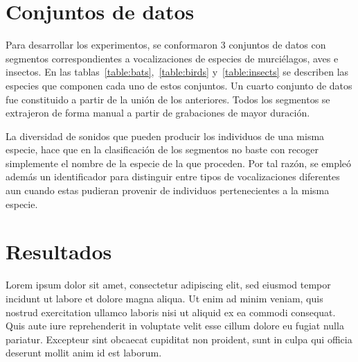 \section{Conjuntos de datos}\label{sec:datasets}

Para desarrollar los experimentos, se conformaron 3 conjuntos de datos con segmentos correspondientes a vocalizaciones de especies de murciélagos, aves e insectos.
En las tablas~\ref{table:bats},~\ref{table:birds} y~\ref{table:insects} se describen las especies que componen cada uno de estos conjuntos.
Un cuarto conjunto de datos fue constituido a partir de la unión de los anteriores.
Todos los segmentos se extrajeron de forma manual a partir de grabaciones de mayor duración.

La diversidad de sonidos que pueden producir los individuos de una misma especie, hace que en la clasificación de los segmentos no baste con recoger simplemente el nombre de la especie de la que proceden.
Por tal razón, se empleó además un identificador para distinguir entre tipos de vocalizaciones diferentes aun cuando estas pudieran provenir de individuos pertenecientes a la misma especie.

\section{Resultados}\label{sec:results}

Lorem ipsum dolor sit amet, consectetur adipiscing elit, sed eiusmod tempor incidunt ut labore et dolore magna aliqua.
Ut enim ad minim veniam, quis nostrud exercitation ullamco laboris nisi ut aliquid ex ea commodi consequat.
Quis aute iure reprehenderit in voluptate velit esse cillum dolore eu fugiat nulla pariatur.
Excepteur sint obcaecat cupiditat non proident, sunt in culpa qui officia deserunt mollit anim id est laborum.
